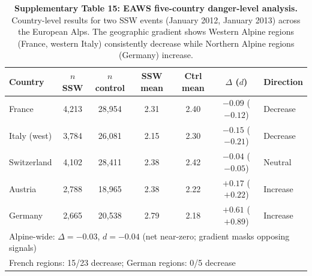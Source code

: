 \begin{table}[!ht]
\centering
\caption{\textbf{Supplementary Table 15: EAWS five-country danger-level analysis.}
Country-level results for two SSW events (January 2012, January 2013) across the European Alps. The geographic gradient shows Western Alpine regions (France, western Italy) consistently decrease while Northern Alpine regions (Germany) increase.}
\label{tab:eaws}
\small
\begin{tabular}{lcccccl}
\toprule
Country & $n$ SSW & $n$ control & SSW mean & Ctrl mean & $\Delta$ ($d$) & Direction \\
\midrule
France & 4,213 & 28,954 & 2.31 & 2.40 & $-0.09$ ($-0.12$) & Decrease \\
Italy (west) & 3,784 & 26,081 & 2.15 & 2.30 & $-0.15$ ($-0.21$) & Decrease \\
Switzerland & 4,102 & 28,411 & 2.38 & 2.42 & $-0.04$ ($-0.05$) & Neutral \\
Austria & 2,788 & 18,965 & 2.38 & 2.22 & $+0.17$ ($+0.22$) & Increase \\
Germany & 2,665 & 20,538 & 2.79 & 2.18 & $+0.61$ ($+0.89$) & Increase \\
\midrule
\multicolumn{7}{l}{Alpine-wide: $\Delta = -0.03$, $d = -0.04$ (net near-zero; gradient masks opposing signals)} \\
\multicolumn{7}{l}{French regions: 15/23 decrease; German regions: 0/5 decrease} \\
\bottomrule
\end{tabular}
\end{table}

